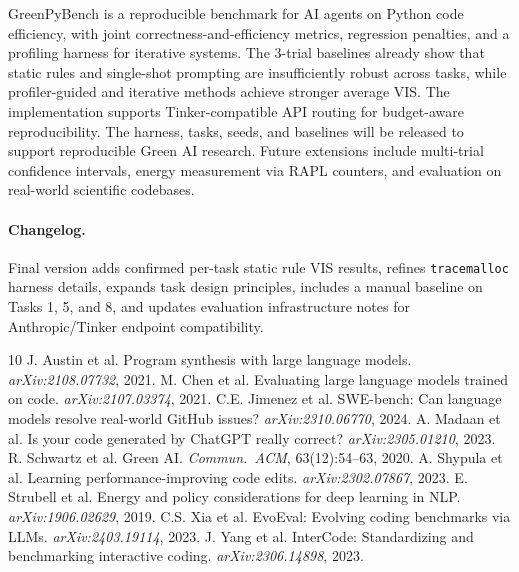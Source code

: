 \documentclass{article}
\begin{document}
GreenPyBench is a reproducible benchmark for AI agents on Python code efficiency, with joint correctness-and-efficiency metrics, regression penalties, and a profiling harness for iterative systems. The 3-trial baselines already show that static rules and single-shot prompting are insufficiently robust across tasks, while profiler-guided and iterative methods achieve stronger average VIS. The implementation supports Tinker-compatible API routing for budget-aware reproducibility. The harness, tasks, seeds, and baselines will be released to support reproducible Green AI research. Future extensions include multi-trial confidence intervals, energy measurement via RAPL counters, and evaluation on real-world scientific codebases.

\paragraph{Changelog.} Final version adds confirmed per-task static rule VIS results, refines \texttt{tracemalloc} harness details, expands task design principles, includes a manual baseline on Tasks 1, 5, and 8, and updates evaluation infrastructure notes for Anthropic/Tinker endpoint compatibility.

\begin{thebibliography}{10}
 J. Austin et al. Program synthesis with large language models. \emph{arXiv:2108.07732}, 2021.
 M. Chen et al. Evaluating large language models trained on code. \emph{arXiv:2107.03374}, 2021.
 C.E. Jimenez et al. SWE-bench: Can language models resolve real-world GitHub issues? \emph{arXiv:2310.06770}, 2024.
 A. Madaan et al. Is your code generated by ChatGPT really correct? \emph{arXiv:2305.01210}, 2023.
 R. Schwartz et al. Green AI. \emph{Commun.\ ACM}, 63(12):54--63, 2020.
 A. Shypula et al. Learning performance-improving code edits. \emph{arXiv:2302.07867}, 2023.
 E. Strubell et al. Energy and policy considerations for deep learning in NLP. \emph{arXiv:1906.02629}, 2019.
 C.S. Xia et al. EvoEval: Evolving coding benchmarks via LLMs. \emph{arXiv:2403.19114}, 2023.
 J. Yang et al. InterCode: Standardizing and benchmarking interactive coding. \emph{arXiv:2306.14898}, 2023.
\end{thebibliography}
\end{document}
